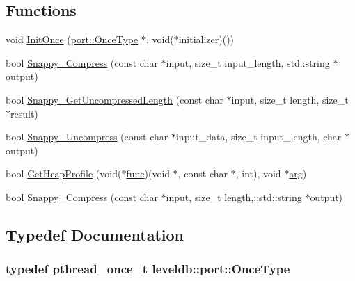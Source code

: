 \subsection*{Functions}
\begin{DoxyCompactItemize}
\item 
void \hyperlink{namespaceleveldb_1_1port_a1493e91d494e6f0ea086a743a562e983}{Init\+Once} (\hyperlink{classleveldb_1_1port_1_1_once_type}{port\+::\+Once\+Type} $\ast$, void($\ast$initializer)())
\item 
bool \hyperlink{namespaceleveldb_1_1port_ae6e60ac8eb298c7eef3bb70ded8c809f}{Snappy\+\_\+\+Compress} (const char $\ast$input, size\+\_\+t input\+\_\+length, std\+::string $\ast$output)
\item 
bool \hyperlink{namespaceleveldb_1_1port_aad536a786dfc1df63d14c6b74178a73b}{Snappy\+\_\+\+Get\+Uncompressed\+Length} (const char $\ast$input, size\+\_\+t length, size\+\_\+t $\ast$result)
\item 
bool \hyperlink{namespaceleveldb_1_1port_ab6f0c4381b00450e06d3000a8cb48a55}{Snappy\+\_\+\+Uncompress} (const char $\ast$input\+\_\+data, size\+\_\+t input\+\_\+length, char $\ast$output)
\item 
bool \hyperlink{namespaceleveldb_1_1port_a1686423180e60af953153121c615f5fe}{Get\+Heap\+Profile} (void($\ast$\hyperlink{testharness_8cc_ac98d5d20f5aab3ef51e0ff5e30d16925}{func})(void $\ast$, const char $\ast$, int), void $\ast$\hyperlink{env__posix_8cc_a9ce2ec4812a92cb6ab39f6e81e9173a9}{arg})
\item 
bool \hyperlink{namespaceleveldb_1_1port_a64d0eafc3cfb484000e6afb5cbcc9d87}{Snappy\+\_\+\+Compress} (const char $\ast$input, size\+\_\+t length,\+::std\+::string $\ast$output)
\end{DoxyCompactItemize}


\subsection{Typedef Documentation}
\hypertarget{namespaceleveldb_1_1port_a80651a8fb458d9b7b3c1f492f9abd055}{}
\subsubsection[{Once\+Type}]{\setlength{\rightskip}{0pt plus 5cm}typedef pthread\+\_\+once\+\_\+t {\bf leveldb\+::port\+::\+Once\+Type}}\label{namespaceleveldb_1_1port_a80651a8fb458d9b7b3c1f492f9abd055}


